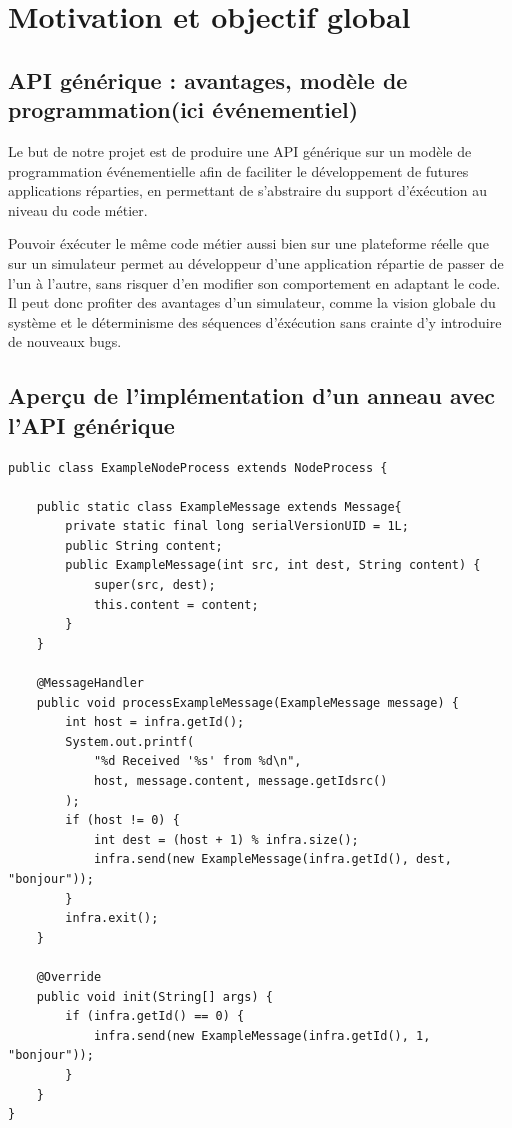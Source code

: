 \documentclass{article}
\begin{document}
		\section{Motivation et objectif global}
			\subsection{API générique : avantages, modèle de programmation(ici événementiel)}
				Le but de notre projet est de produire une API générique sur un modèle de programmation événementielle afin de faciliter le développement de futures applications réparties, en permettant de s'abstraire du support d'éxécution au niveau du code métier. \par
Pouvoir éxécuter le même code métier aussi bien sur une plateforme réelle que sur un simulateur permet au développeur d'une application répartie de passer de l'un à l'autre, sans risquer d'en  modifier son comportement en adaptant le code. \newline Il peut donc profiter des avantages d'un simulateur, comme la vision globale du système et le déterminisme des séquences d'éxécution  sans crainte d'y introduire de nouveaux bugs. \par
 
			\newpage
			\subsection{Aperçu de l'implémentation d'un anneau avec l'API générique}
				\begin{lstlisting}
public class ExampleNodeProcess extends NodeProcess {

	public static class ExampleMessage extends Message{
		private static final long serialVersionUID = 1L;
		public String content;
		public ExampleMessage(int src, int dest, String content) {
			super(src, dest);
			this.content = content;
		}
	}

	@MessageHandler
	public void processExampleMessage(ExampleMessage message) {
		int host = infra.getId();
		System.out.printf(
			"%d Received '%s' from %d\n",
			host, message.content, message.getIdsrc()
		);
		if (host != 0) {
			int dest = (host + 1) % infra.size();
			infra.send(new ExampleMessage(infra.getId(), dest, "bonjour"));
		}
		infra.exit();
	}

	@Override
	public void init(String[] args) {
		if (infra.getId() == 0) {
			infra.send(new ExampleMessage(infra.getId(), 1, "bonjour"));
		}
	}
}
				\end{lstlisting}
\end{document}

